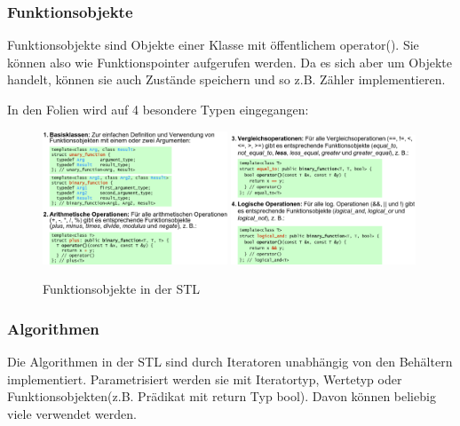 \documentclass[12pt]{scrartcl}
\begin{document}
\subsubsection{Funktionsobjekte}

Funktionsobjekte sind Objekte einer Klasse mit öffentlichem operator(). Sie können also wie Funktionspointer aufgerufen werden.
Da es sich aber um Objekte handelt, können sie auch Zustände speichern und so z.B. Zähler implementieren.

In den Folien wird auf 4 besondere Typen eingegangen:

\begin{figure}[H]
	\centering
	\includegraphics[width=0.49\textwidth]{images/stl_3.png}
	\includegraphics[width=0.49\textwidth]{images/stl_4.png}
	\caption{Funktionsobjekte in der STL}
\end{figure}

\subsubsection{Algorithmen}

Die Algorithmen in der STL sind durch Iteratoren unabhängig von den Behältern implementiert.
Parametrisiert werden sie mit Iteratortyp, Wertetyp oder Funktionsobjekten(z.B. Prädikat mit return Typ bool).
Davon können beliebig viele verwendet werden.
\end{document}
